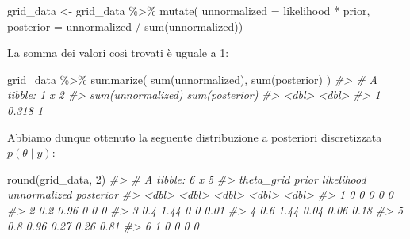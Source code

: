\documentclass[
]{memoir}
\newenvironment{Shaded}{\begin{snugshade}}{\end{snugshade}}
\newcommand{\AttributeTok}[1]{\textcolor[rgb]{0.77,0.63,0.00}{#1}}
\newcommand{\CommentTok}[1]{\textcolor[rgb]{0.56,0.35,0.01}{\textit{#1}}}
\newcommand{\DecValTok}[1]{\textcolor[rgb]{0.00,0.00,0.81}{#1}}
\newcommand{\FunctionTok}[1]{\textcolor[rgb]{0.00,0.00,0.00}{#1}}
\newcommand{\NormalTok}[1]{#1}
\newcommand{\OtherTok}[1]{\textcolor[rgb]{0.56,0.35,0.01}{#1}}
\newcommand{\SpecialCharTok}[1]{\textcolor[rgb]{0.00,0.00,0.00}{#1}}
\begin{document}
\begin{Shaded}
\begin{Highlighting}[]
\NormalTok{grid\_data }\OtherTok{\textless{}{-}}\NormalTok{ grid\_data }\SpecialCharTok{\%\textgreater{}\%}
  \FunctionTok{mutate}\NormalTok{(}
    \AttributeTok{unnormalized =}\NormalTok{ likelihood }\SpecialCharTok{*}\NormalTok{ prior,}
    \AttributeTok{posterior =}\NormalTok{ unnormalized }\SpecialCharTok{/} \FunctionTok{sum}\NormalTok{(unnormalized))}
\end{Highlighting}
\end{Shaded}

\noindent
La somma dei valori così trovati è uguale a 1:

\begin{Shaded}
\begin{Highlighting}[]
\NormalTok{grid\_data }\SpecialCharTok{\%\textgreater{}\%}
  \FunctionTok{summarize}\NormalTok{(}
    \FunctionTok{sum}\NormalTok{(unnormalized),}
    \FunctionTok{sum}\NormalTok{(posterior)}
\NormalTok{  )}
\CommentTok{\#\textgreater{} \# A tibble: 1 x 2}
\CommentTok{\#\textgreater{}   \textasciigrave{}sum(unnormalized)\textasciigrave{} \textasciigrave{}sum(posterior)\textasciigrave{}}
\CommentTok{\#\textgreater{}                 \textless{}dbl\textgreater{}            \textless{}dbl\textgreater{}}
\CommentTok{\#\textgreater{} 1               0.318                1}
\end{Highlighting}
\end{Shaded}

\noindent
Abbiamo dunque ottenuto la seguente distribuzione a posteriori discretizzata \(p(\theta \mid y)\):

\begin{Shaded}
\begin{Highlighting}[]
\FunctionTok{round}\NormalTok{(grid\_data, }\DecValTok{2}\NormalTok{)}
\CommentTok{\#\textgreater{} \# A tibble: 6 x 5}
\CommentTok{\#\textgreater{}   theta\_grid prior likelihood unnormalized posterior}
\CommentTok{\#\textgreater{}        \textless{}dbl\textgreater{} \textless{}dbl\textgreater{}      \textless{}dbl\textgreater{}        \textless{}dbl\textgreater{}     \textless{}dbl\textgreater{}}
\CommentTok{\#\textgreater{} 1        0    0          0            0         0   }
\CommentTok{\#\textgreater{} 2        0.2  0.96       0            0         0   }
\CommentTok{\#\textgreater{} 3        0.4  1.44       0            0         0.01}
\CommentTok{\#\textgreater{} 4        0.6  1.44       0.04         0.06      0.18}
\CommentTok{\#\textgreater{} 5        0.8  0.96       0.27         0.26      0.81}
\CommentTok{\#\textgreater{} 6        1    0          0            0         0}
\end{Highlighting}
\end{Shaded}
\end{document}
